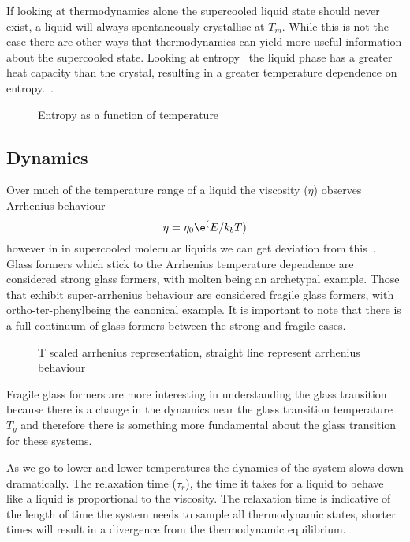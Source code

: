 If looking at thermodynamics alone the supercooled liquid state should never exist, a liquid will always spontaneously crystallise at $T_m$. While this is not the case there are other ways that thermodynamics can yield more useful information about the supercooled state. Looking at entropy~ the liquid phase has a greater heat capacity than the crystal, resulting in a greater temperature dependence on entropy.~\cite{debenedetti:01}.

\begin{figure}
    \caption{Entropy as a function of temperature}
    \label{fig:entropy}
\end{figure}

\subsection{Dynamics}

Over much of the temperature range of a liquid the viscosity ($\eta$) observes Arrhenius behaviour
\begin{equation}
    \eta = \eta_0 \e^(E/k_bT)
\end{equation}
however in in supercooled molecular liquids we can get deviation from this~. Glass formers which stick to the Arrhenius temperature dependence are considered strong glass formers, with molten  being an archetypal example. Those that exhibit super-arrhenius behaviour are considered fragile glass formers, with ortho-ter-phenyl\tocheck being the canonical example. It is important to note that there is a full continuum of glass formers between the strong and fragile cases.

\begin{figure}
    \caption{T scaled arrhenius representation, straight line represent arrhenius behaviour}
    \label{fig:angell}
\end{figure}

Fragile glass formers are more interesting in understanding the glass transition because there is a change in the dynamics near the glass transition temperature $T_g$ and therefore there is something more fundamental about the glass transition for these systems. 

As we go to lower and lower temperatures the dynamics of the system slows down dramatically. The relaxation time ($\tau_r$), the time it takes for a liquid to behave like a liquid is proportional to the viscosity. The relaxation time is indicative of the length of time the system needs to sample all thermodynamic states, shorter times will result in a divergence from the thermodynamic equilibrium.


